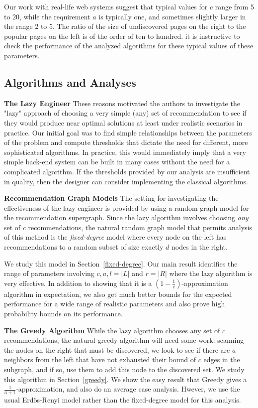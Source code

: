 Our work with real-life web systems suggest that typical values for $c$ range from 5 to 20, while the requirement $a$ is typically one, and sometimes slightly larger in the range 2 to 5. The ratio of the size of undiscovered pages on the right to the popular pages on the left is of the order of ten to hundred. it is instructive to check the performance of the analyzed algorithms for these typical values of these parameters.

\subsection{Algorithms and Analyses}

{\bf The Lazy Engineer}
These reasons motivated the authors to investigate the "lazy" approach of choosing a very simple (any) set of recommendation to see if they would produce near optimal solutions at least under realistic scenarios in practice. Our initial goal was to find simple relationships between the parameters of the problem and compute thresholds that dictate the need for different, more sophisticated algorithms. In practice, this would immediately imply that a very simple back-end system can be built in many cases without the need for a complicated algorithm. If the thresholds provided by our analysis are insufficient in quality, then the designer can consider implementing the classical algorithms.

{\bf Recommendation Graph Models}
The setting for investigating the effectiveness of the lazy engineer is provided by using a random graph model for the recommendation supergraph. Since the lazy algorithm involves choosing {\em any} set of $c$ recommendations, the natural random graph model that permits analysis of this method is the {\em fixed-degree} model where every node on the left has recommendations to a random subset of size exactly $d$ nodes in the right. 

We study this model in Section~\ref{fixed-degree}. Our main result identifies the range of parameters involving $c,a,l=|L|$ and $r =|R|$ where the lazy algorithm is very effective. In addition to showing that it is a $(1-\frac1e)$-approximation algorithm in expectation, we also get much better bounds for the expected performance for a wide range of realistic parameters and also prove high probability bounds on its performance.


{\bf The Greedy Algorithm}
While the lazy algorithm chooses any set of $c$ recommendations, the natural greedy algorithm will need some work: scanning the nodes on the right that must be discovered, we look to see if there are $a$ neighbors from the left that have not exhausted their bound of $c$ edges in the subgraph, and if so, use them to add this node to the discovered set. We study this algorithm in Section~\ref{greedy}. We show the easy result that Greedy gives a $\frac{1}{a+1}$-approximation, and also do an average case analysis. Hwever, we use the usual Erd\"os-Renyi model rather than the fixed-degree model for this analysis.

